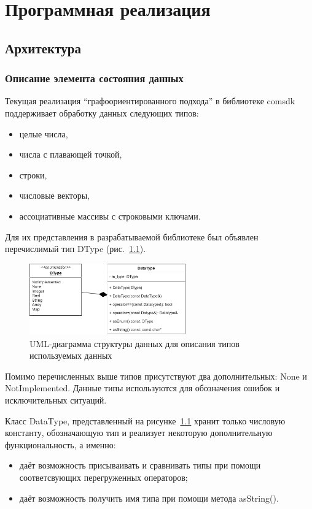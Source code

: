 \chapter{Программная реализация}\label{chap3_soft_architecture}
\section{Архитектура}
\subsection{Описание элемента состояния данных}
Текущая реализация ``графоориентированного подхода'' в библиотеке comsdk поддерживает обработку данных следующих типов:
\begin{itemize}
    \item целые числа,
    \item числа с плавающей точкой,
    \item строки,
    \item числовые векторы,
    \item ассоциативные массивы с строковыми ключами.
\end{itemize}

Для их представления в разрабатываемой библиотеке был объявлен перечислимый тип \textsf{DType} (рис.~\ref{fig:UMLDatatype}).

\begin{figure}
    \centering
    \includegraphics[width=0.6\textwidth]{figures/UML.datatype.png}
    \caption{UML-диаграмма структуры данных для описания типов используемых данных}
    \label{fig:UMLDatatype}
\end{figure}

Помимо перечисленных выше типов присутствуют два дополнительных: None и NotImplemented. Данные типы используются для обозначения ошибок и исключительных ситуаций.

Класс \textsf{DataType}, представленный на рисунке~\ref{fig:UMLDatatype} хранит только числовую константу, обозначающую тип и реализует некоторую дополнительную функциональность, а именно:
\begin{itemize}
    \item даёт возможность присываивать и сравнивать типы при помощи соответсвующих перегруженных операторов;
    \item даёт возможность получить имя типа при помощи метода \textsf{asString()}.
\end{itemize}

